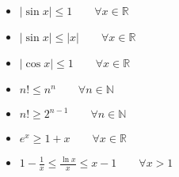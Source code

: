 \documentclass[a4paper,12pt]{article}
\begin{document}
\begin{center}
\end{center}

\vspace{1cm}

\begin{itemize}
    \item $|\sin x|\leq 1\qquad \forall x\in \mathbb{R}$
    \item $|\sin x|\leq |x|\qquad \forall x\in \mathbb{R}$
    \item $|\cos x|\leq 1\qquad \forall x\in \mathbb{R}$
    \item $n!\leq n^n\qquad \forall n\in \mathbb{N}$
    \item $n!\geq 2^{n-1} \qquad \forall n\in \mathbb{N}$
    \item $e^x\geq 1+x \qquad \forall x\in \mathbb{R}$
    \item $1-\frac{1}{x}\leq \frac{\ln x}{x}\leq x-1 \qquad \forall x>1$
\end{itemize}
\end{document}
